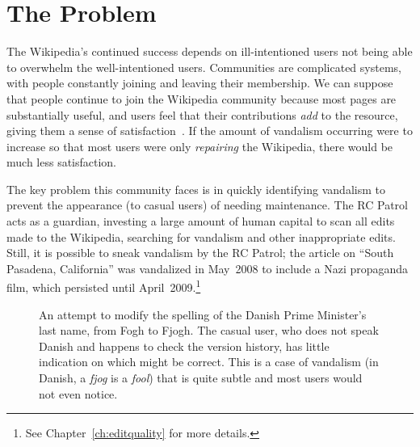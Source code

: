 \section{The Problem}

The Wikipedia's continued success depends on ill-intentioned users
not being able to overwhelm the well-intentioned users.
Communities are complicated systems, with people constantly joining and
leaving their membership.
We can suppose that people continue to
join the Wikipedia community because most pages are
substantially useful, and users feel that their contributions
\textit{add} to the resource,
giving them a sense of satisfaction~\cite{Benkler2002}.
If the amount of vandalism occurring were to increase so that
most users were only \textit{repairing} the Wikipedia, there
would be much less satisfaction.

The key problem this community faces is in quickly identifying vandalism
to prevent the appearance (to casual users)
of needing maintenance.
The RC Patrol~\cite{wiki:RCPatrol} acts as a guardian,
investing a large amount of human capital to scan all
edits made to the Wikipedia, searching for vandalism and
other inappropriate edits.
Still, it is possible to sneak vandalism by the
RC Patrol; the article on ``South Pasadena, California''
was vandalized in May~2008 to include a Nazi propaganda film,
which persisted until April~2009.\footnote{See Chapter~\ref{ch:editquality}
for more details.}

\begin{figure}[t]
\centering
{}
\hspace{1ex}
\caption[An example of vandalism which is not obvious to the casual reader]{
  An attempt to modify the
  spelling of the Danish Prime Minister's last name, from Fogh to Fjogh.
  The casual user, who does not speak Danish and happens to check
  the version history, has little indication on which might be correct.
  This is a case of vandalism
  (in Danish, a \textit{fjog} is a \textit{fool})
  that is quite subtle and most users would not even notice.}
\label{fig-denmark}
\end{figure}


